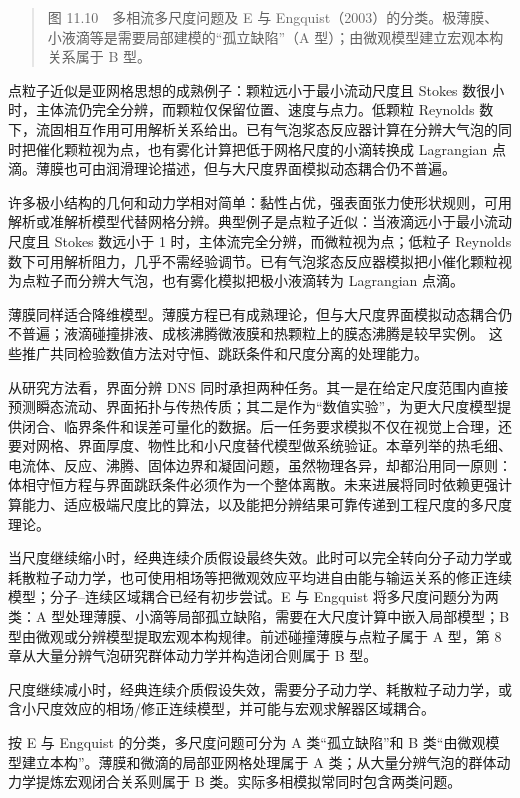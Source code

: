 \documentclass[11pt,a4paper,openany,fontset=none]{ctexbook}
\begin{document}
\begin{quote}\small 图 11.10　多相流多尺度问题及 E 与 Engquist（2003）的分类。极薄膜、小液滴等是需要局部建模的“孤立缺陷”（A 型）；由微观模型建立宏观本构关系属于 B 型。\end{quote}
点粒子近似是亚网格思想的成熟例子：颗粒远小于最小流动尺度且 Stokes 数很小时，主体流仍完全分辨，而颗粒仅保留位置、速度与点力。低颗粒 Reynolds 数下，流固相互作用可用解析关系给出。已有气泡浆态反应器计算在分辨大气泡的同时把催化颗粒视为点，也有雾化计算把低于网格尺度的小滴转换成 Lagrangian 点滴。薄膜也可由润滑理论描述，但与大尺度界面模拟动态耦合仍不普遍。

许多极小结构的几何和动力学相对简单：黏性占优，强表面张力使形状规则，可用解析或准解析模型代替网格分辨。典型例子是点粒子近似：当液滴远小于最小流动尺度且 Stokes 数远小于 1 时，主体流完全分辨，而微粒视为点；低粒子 Reynolds 数下可用解析阻力，几乎不需经验调节。已有气泡浆态反应器模拟把小催化颗粒视为点粒子而分辨大气泡，也有雾化模拟把极小液滴转为 Lagrangian 点滴。

薄膜同样适合降维模型。薄膜方程已有成熟理论，但与大尺度界面模拟动态耦合仍不普遍；液滴碰撞排液、成核沸腾微液膜和热颗粒上的膜态沸腾是较早实例。%
这些推广共同检验数值方法对守恒、跳跃条件和尺度分离的处理能力。

从研究方法看，界面分辨 DNS 同时承担两种任务。其一是在给定尺度范围内直接预测瞬态流动、界面拓扑与传热传质；其二是作为“数值实验”，为更大尺度模型提供闭合、临界条件和误差可量化的数据。后一任务要求模拟不仅在视觉上合理，还要对网格、界面厚度、物性比和小尺度替代模型做系统验证。本章列举的热毛细、电流体、反应、沸腾、固体边界和凝固问题，虽然物理各异，却都沿用同一原则：体相守恒方程与界面跳跃条件必须作为一个整体离散。未来进展将同时依赖更强计算能力、适应极端尺度比的算法，以及能把分辨结果可靠传递到工程尺度的多尺度理论。

当尺度继续缩小时，经典连续介质假设最终失效。此时可以完全转向分子动力学或耗散粒子动力学，也可使用相场等把微观效应平均进自由能与输运关系的修正连续模型；分子--连续区域耦合已经有初步尝试。E 与 Engquist 将多尺度问题分为两类：A 型处理薄膜、小滴等局部孤立缺陷，需要在大尺度计算中嵌入局部模型；B 型由微观或分辨模型提取宏观本构规律。前述碰撞薄膜与点粒子属于 A 型，第 8 章从大量分辨气泡研究群体动力学并构造闭合则属于 B 型。

尺度继续减小时，经典连续介质假设失效，需要分子动力学、耗散粒子动力学，或含小尺度效应的相场/修正连续模型，并可能与宏观求解器区域耦合。

按 E 与 Engquist 的分类，多尺度问题可分为 A 类“孤立缺陷”和 B 类“由微观模型建立本构”。薄膜和微滴的局部亚网格处理属于 A 类；从大量分辨气泡的群体动力学提炼宏观闭合关系则属于 B 类。实际多相模拟常同时包含两类问题。
\end{document}
